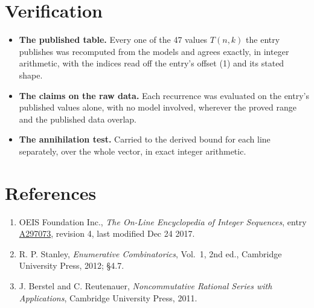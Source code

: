 \documentclass[11pt]{article}
\theoremstyle{definition}
\begin{document}
\section{Verification}

\begin{itemize}

\item {\bfseries The published table.} Every one of the 47 values $T(n,k)$ the entry publishes was recomputed from the models and agrees exactly, in integer arithmetic, with the indices read off the entry's offset (1) and its stated shape.

\item {\bfseries The claims on the raw data.} Each recurrence was evaluated on the entry's published values alone, with no model involved, wherever the proved range and the published data overlap.

\item {\bfseries The annihilation test.} Carried to the derived bound for each line separately, over the whole vector, in exact integer arithmetic.

\end{itemize}

\section{References}

\begin{enumerate}

\item OEIS Foundation Inc., \emph{The On-Line Encyclopedia of Integer Sequences}, entry \href{https://oeis.org/A297073}{A297073}, revision 4, last modified Dec 24 2017.

\item R. P. Stanley, \emph{Enumerative Combinatorics}, Vol.~1, 2nd ed., Cambridge University Press, 2012; \S4.7.

\item J. Berstel and C. Reutenauer, \emph{Noncommutative Rational Series with Applications}, Cambridge University Press, 2011.

\end{enumerate}
\end{document}
